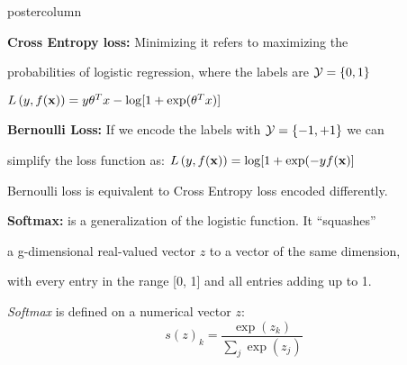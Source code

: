 \documentclass{beamer}
\begin{document}
\begin{frame}[fragile]{}
\begin{columns}
\begin{column}{.31\textwidth}
\begin{beamercolorbox}[center]{postercolumn}
\begin{minipage}{.98\textwidth}
{\begin{myblock}{}
  \vspace*{1ex}
  
  \begin{codebox}
  \textbf{Cross Entropy loss: }Minimizing it refers to maximizing the
  \end{codebox}
  
  \begin{codebox}
  probabilities of logistic regression, where the labels are $\mathcal{Y} = \{0,1\}$
    \end{codebox}
  
  \hspace*{1ex}$L\left(y, f(\mathbf{x})\right) = y \theta^T x - \log[1 + \exp(\theta^T x)]$
  
  \vspace*{1ex}
  \begin{codebox}
  \textbf{Bernoulli Loss: }If we encode the labels with $\mathcal{Y} = \{-1,+1\}$ we can
  \end{codebox}
  
  \begin{codebox}
  simplify the loss function as: $L\left(y, f(\mathbf{x})\right) = \log[1 + \exp(-y f(\mathbf{x})] $
    \end{codebox}
  \hspace*{1ex}Bernoulli loss is equivalent to Cross Entropy loss encoded differently.
  
  \vspace*{1ex}
  \begin{codebox}
  \textbf{Softmax: }is a generalization of the logistic function. It \enquote{squashes}
  \end{codebox}
  
  \begin{codebox}
  a g-dimensional real-valued vector $z$ to a vector of the same dimension,
  \end{codebox}
  
  \begin{codebox}
  with every entry in the range [0, 1] and all entries adding up to 1.
  \end{codebox}
  
  \hspace*{1ex}\emph{Softmax} is defined on a numerical vector $z$: $$ s(z)_k = \frac{\exp(z_k)}{\sum_{j}\exp(z_j)} $$
  \end{myblock}
}
\end{minipage}
		\end{beamercolorbox}
	\end{column}
\end{columns}
\end{frame}
\end{document}
